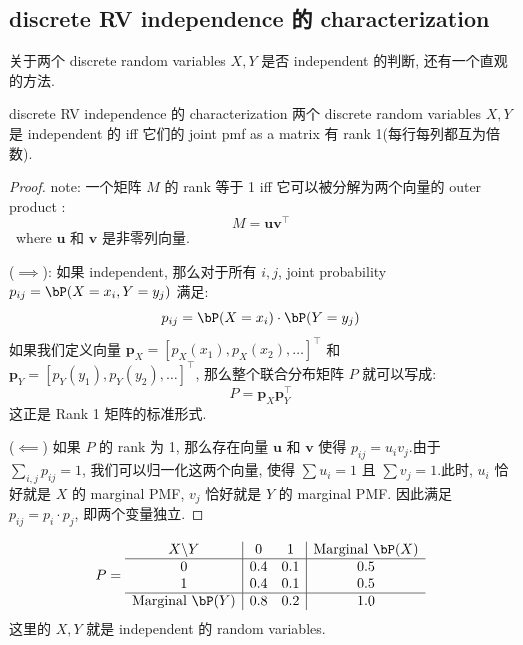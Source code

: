 \subsection{discrete RV independence 的 characterization}
\begin{remark}
关于两个 discrete random variables \(X, Y\) 是否 independent 的判断,
还有一个直观的方法.
\begin{proposition}{discrete RV independence 的 characterization}\label{discrete RV independence 的 characterization}
    两个 discrete random variables \(X, Y\) 
    是 independent 的 iff 它们的 joint pmf as a matrix 
    有 rank 1(每行每列都互为倍数).
\end{proposition}
\begin{proof}
note: 一个矩阵 $M$ 的 rank 等于 1 iff 它可以被分解为两个向量的 outer product
:$$M = \mathbf{u}\mathbf{v}^\top$$\
where $\mathbf{u}$ 和 $\mathbf{v}$ 是非零列向量.

($\implies$): 如果 independent, 
那么对于所有 $i, j$,
joint probability $p_{ij} = \bP(X=x_i, Y=y_j)$ 
满足:$$p_{ij} = \bP(X=x_i) \cdot \bP(Y=y_j)$$
如果我们定义向量 $\mathbf{p}_X = [p_X(x_1), p_X(x_2), \dots]^\top$ 
和 $\mathbf{p}_Y = [p_Y(y_1), p_Y(y_2), \dots]^\top$, 
那么整个联合分布矩阵 $P$ 就可以写成:$$P = \mathbf{p}_X \mathbf{p}_Y^\top$$
这正是 Rank 1 矩阵的标准形式. 

($\impliedby$) 
如果 $P$ 的 rank 为 1, 
那么存在向量 $\mathbf{u}$ 和 $\mathbf{v}$ 
使得 $p_{ij} = u_i v_j$.由于 $\sum_{i,j} p_{ij} = 1$, 
我们可以归一化这两个向量, 使得 $\sum u_i = 1$ 
且 $\sum v_j = 1$.此时, $u_i$ 恰好就是 $X$ 的 marginal PMF, 
$v_j$ 恰好就是 $Y$ 的 marginal PMF. 因此满足 $p_{ij} = p_i \cdot p_j$, 即两个变量独立.
\end{proof}
\begin{example}
    \[
    P = 
    \begin{array}{c|cc|c}
    X \backslash Y & 0 & 1 & \text{Marginal } \bP(X) \\ \hline
    0 & 0.4 & 0.1 & 0.5 \\
    1 & 0.4 & 0.1 & 0.5 \\ \hline
    \text{Marginal } \bP(Y) & 0.8 & 0.2 & 1.0
    \end{array}
    \]
这里的 \(X,Y\) 就是 independent 的 random variables.
\end{example}
\end{remark}

